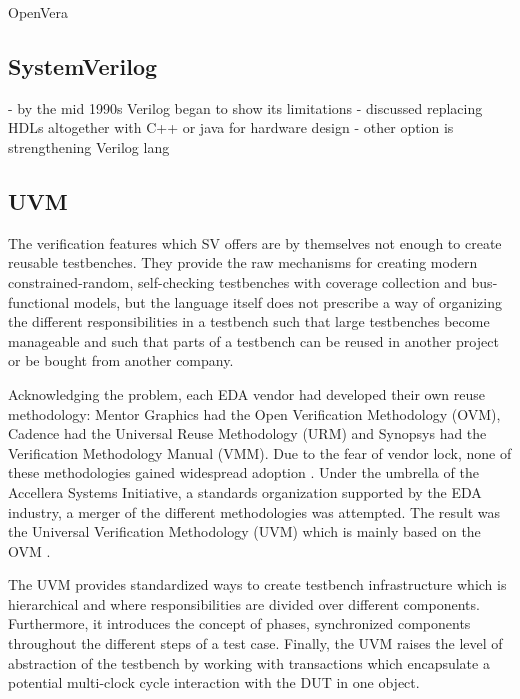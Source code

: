 \documentclass[12pt]{report}
\begin{document}
OpenVera \cite[Sec. 7, pp. 51-??]{flake2020a}

\subsection{SystemVerilog} %

\cite[Sec. 6, pp. 43]{flake2020a}
- by the mid 1990s Verilog began to show its limitations
- discussed replacing HDLs altogether with C++ or java for hardware design
- other option is strengthening Verilog lang

\subsection{UVM} %

The verification features which SV offers are by themselves not enough to create reusable testbenches. They provide
the raw mechanisms for creating modern constrained-random, self-checking testbenches with coverage collection and
bus-functional models, but the language itself does not prescribe a way of organizing the different responsibilities
in a testbench such that large testbenches become manageable and such that parts of a testbench can be reused in
another project or be bought from another company.

Acknowledging the problem, each EDA vendor had developed their own reuse methodology: Mentor Graphics had the Open
Verification Methodology (OVM), Cadence had the Universal Reuse Methodology (URM) and Synopsys had the Verification
Methodology Manual (VMM). Due to the fear of vendor lock, none of these methodologies gained widespread adoption
\cite[ch. 4]{mehta2018asic}. Under the umbrella of the Accellera Systems Initiative, a standards organization
supported by the EDA industry, a merger of the different methodologies was attempted. The result was the Universal
Verification Methodology (UVM) which is mainly based on the OVM \cite[ch. 4]{mehta2018asic}.

The UVM provides standardized ways to create testbench infrastructure which is hierarchical and where
responsibilities are divided over different components. Furthermore, it introduces the concept of phases,
synchronized components throughout the different steps of a test case. Finally, the UVM raises the level of
abstraction of the testbench by working with transactions which encapsulate a potential multi-clock cycle interaction
with the DUT in one object.
\end{document}
